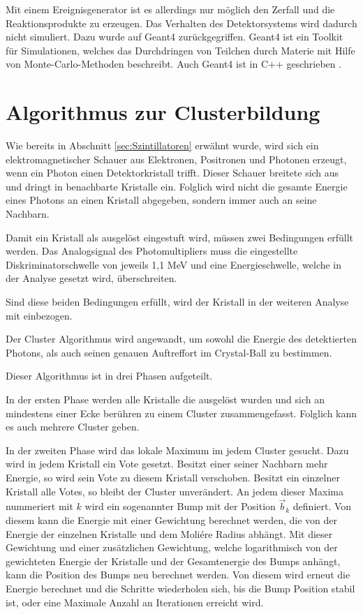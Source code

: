 \documentclass[a4paper,11pt,oneside,final,german,openbib,pdftex]{scrbook}
\begin{document}
{Mit einem Ereignisgenerator ist es allerdings nur m\"oglich den Zerfall und die Reaktionsprodukte zu erzeugen. Das Verhalten des Detektorsystems wird dadurch nicht simuliert. Dazu wurde auf Geant4 zur\"uckgegriffen. Geant4 ist ein Toolkit f\"ur Simulationen, welches das Durchdringen von Teilchen durch Materie mit Hilfe von Monte-Carlo-Methoden beschreibt. Auch Geant4 ist in C++ geschrieben \cite{Ge04}.


\section{Algorithmus zur Clusterbildung}
\label{sec:Clustering-Algorithmus}

Wie bereits in Abschnitt \ref{sec:Szintillatoren} erw\"ahnt wurde, wird sich ein elektromagnetischer Schauer aus Elektronen, Positronen und Photonen erzeugt, wenn ein Photon einen Detektorkristall trifft. Dieser Schauer breitete sich aus und dringt in benachbarte Kristalle ein. Folglich wird nicht die gesamte Energie eines Photons an einen Kristall abgegeben, sondern immer auch an seine Nachbarn.

Damit ein Kristall als ausgel\"ost eingestuft wird, m\"ussen zwei Bedingungen erf\"ullt werden.
Das Analogsignal des Photomultipliers muss die eingestellte Diskriminatorschwelle von jeweils 1,1 MeV und eine Energieschwelle, welche in der Analyse gesetzt wird, \"uberschreiten.

Sind diese beiden Bedingungen erf\"ullt, wird der Kristall in der weiteren Analyse mit einbezogen.
 
 Der Cluster Algorithmus wird angewandt, um sowohl die Energie des detektierten Photons, als auch seinen genauen Auftreffort im Crystal-Ball zu bestimmen.
 
 Dieser Algorithmus ist in drei Phasen aufgeteilt.
 
 In der ersten Phase werden alle Kristalle die ausgel\"ost wurden und sich an mindestens einer Ecke ber\"uhren zu einem Cluster zusammengefasst. Folglich kann es auch mehrere Cluster geben.
 
 In der zweiten Phase wird das lokale Maximum im jedem Cluster gesucht. Dazu wird in jedem Kristall ein Vote gesetzt. Besitzt einer seiner Nachbarn mehr Energie, so wird sein Vote zu diesem Kristall verschoben. Besitzt ein einzelner Kristall alle Votes, so bleibt der Cluster unver\"andert. An jedem dieser Maxima nummeriert mit $k$ wird ein sogenannter Bump mit der Position $\vec{b}_k$ definiert. Von diesem kann die Energie mit einer Gewichtung berechnet werden, die von der Energie der einzelnen Kristalle und dem Moli\'ere Radius abh\"angt. Mit dieser Gewichtung und einer zus\"atzlichen Gewichtung, welche logarithmisch von der gewichteten Energie der Kristalle und der Gesamtenergie des Bumps anh\"angt, kann die Position des Bumps neu berechnet werden. Von diesem wird erneut die Energie berechnet und die Schritte wiederholen sich, bis die Bump Position stabil ist, oder eine Maximale Anzahl an Iterationen erreicht wird.
 
}
\end{document}
